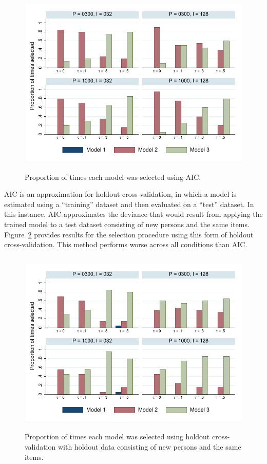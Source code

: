 \documentclass[12pt, letterpaper]{article}
\begin{document}
\begin{figure}[htbp]
	\centering
	\includegraphics[height=3.5in, trim = 1mm 1mm 1mm 1mm, clip=true]
		{chapter_2/figs/p_aic.pdf}
	\caption{Proportion of times each model was selected using AIC.}
	\label{fig:aic-bar}
\end{figure}

AIC is an approximation for holdout cross-validation, in which a model is estimated using a ``training'' dataset and then evaluated on a ``test'' dataset. In this instance, AIC approximates the deviance that would result from applying the trained model to a test dataset consisting of new persons and the same items. Figure~\ref{fig:person-bar} provides results for the selection procedure using this form of holdout cross-validation. This method performs worse across all conditions than AIC.

\begin{figure}[htbp]
	\centering
	\includegraphics[height=3.5in, trim = 1mm 1mm 1mm 1mm, clip=true]
		{chapter_2/figs/p_new_person_same_item.pdf}
	\caption{Proportion of times each model was selected using holdout cross-validation with holdout data consisting of new persons and the same items.}
	\label{fig:person-bar}
\end{figure}
\end{document}
